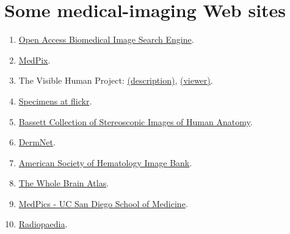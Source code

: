 \section{Some medical-imaging Web sites}
\begin{enumerate}
\item \href{https://openi.nlm.nih.gov/}{Open Access Biomedical Image Search Engine}.
\item \href{https://medpix.nlm.nih.gov/home}{MedPix}.
\item The Visible Human Project:
  \href{https://www.nlm.nih.gov/research/visible/visible_human.html}{(description)},
  \href{https://visiblehumanproject.com/}{(viewer)}.
\item
  \href{https://www.flickr.com/photos/euthman/albums/72057594114099781/}{Specimens
    at flickr}.
\item
  \href{https://lane.stanford.edu/biomed-resources/bassett/index.html}{Bassett
    Collection of Stereoscopic Images of Human Anatomy}.
\item \href{https://dermnetnz.org/images}{DermNet}.
\item \href{http://imagebank.hematology.org/}{American Society of
    Hematology Image Bank}.
\item \href{http://www.med.harvard.edu/AANLIB/home.html}{The Whole
    Brain Atlas}.
\item \href{https://medpics.ucsd.edu/index.cfm}{MedPics - UC San Diego
    School of Medicine}.
\item \href{https://radiopaedia.org/}{Radiopaedia}.
\end{enumerate}
